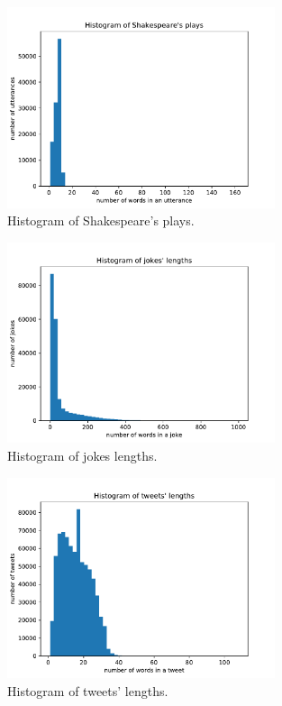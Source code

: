 \begin{figure}
  \centering
  \includegraphics[width=0.7\textwidth]{figures/shakespeare.pdf}
  \caption{Histogram of Shakespeare's plays.}
  \label{fig:shakespeare}
\end{figure}

\begin{figure}[hbt]
  \centering
  \includegraphics[width=0.7\textwidth]{figures/jokes.pdf}
  \caption{Histogram of jokes lengths.}
  \label{fig:jokes}
\end{figure}

\begin{figure}[hbt]
  \centering
  \includegraphics[width=0.7\textwidth]{figures/tweet.pdf}
  \caption{Histogram of tweets' lengths.}
  \label{fig:tweet}
\end{figure}


